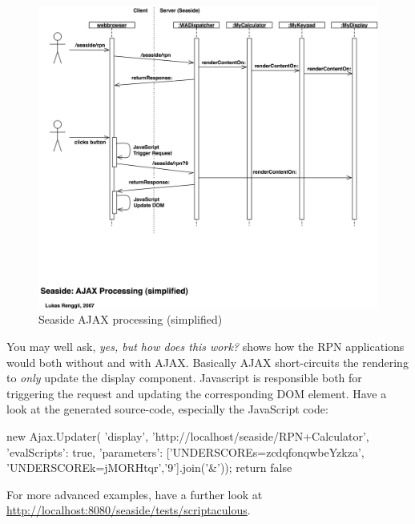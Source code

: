 \documentclass[a4paper,10pt,twoside]{book}
\begin{document}
{{\begin{figure}[ht]
\begin{center}
\includegraphics[width=\textwidth]{ajax-processing}
\caption{Seaside AJAX processing (simplified)}
\end{center}
\end{figure}


You may well ask, \emph{yes, but how does this work?}
 shows how the RPN applications would both without and with AJAX.
Basically AJAX short-circuits the rendering to \emph{only} update the display component.
Javascript is responsible both for triggering the request and updating the corresponding DOM element.
Have a look at the generated source-code, especially the JavaScript code:

\begin{code}{}
new Ajax.Updater(
	'display',
	'http://localhost/seaside/RPN+Calculator',
	{'evalScripts': true,
	  'parameters': ['UNDERSCOREs=zcdqfonqwbeYzkza', 'UNDERSCOREk=jMORHtqr','9'].join('&')});
return false
\end{code}

For more advanced examples, have a further look at \url{http://localhost:8080/seaside/tests/scriptaculous}.

}}
\end{document}
